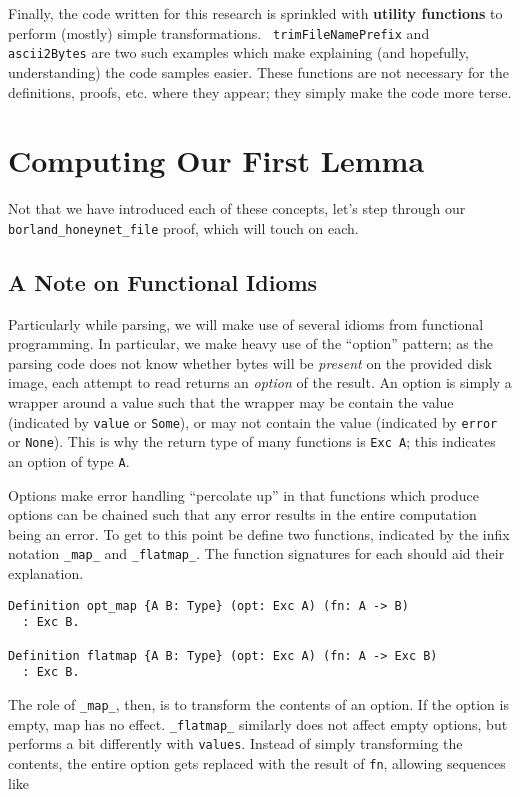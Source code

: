 \documentclass[nocopyrightspace]{sigplanconf}
\begin{document}
Finally, the code written for this research is sprinkled with {\bf utility
functions} to perform (mostly) simple transformations. {\tt
trimFileNamePrefix} and {\tt ascii2Bytes} are two such examples which make
explaining (and hopefully, understanding) the code samples easier. These
functions are not necessary for the definitions, proofs, etc. where they
appear; they simply make the code more terse.

\section{Computing Our First Lemma}

Not that we have introduced each of these concepts, let's step through our
{\tt borland\_honeynet\_file} proof, which will touch on each.

\subsection{A Note on Functional Idioms}

Particularly while parsing, we will make use of several idioms from functional
programming. In particular, we make heavy use of the ``option'' pattern; as
the parsing code does not know whether bytes will be {\em present} on the
provided disk image, each attempt to read returns an {\em option} of the
result. An option is simply a wrapper around a value such that the wrapper may
be contain the value (indicated by {\tt value} or {\tt Some}), or may not
contain the value (indicated by {\tt error} or {\tt None}). This is why the
return type of many functions is {\tt Exc A}; this indicates an option of type
{\tt A}.

Options make error handling ``percolate up'' in that functions which produce
options can be chained such that any error results in the entire computation
being an error. To get to this point be define two functions, indicated by the
infix notation {\tt \_map\_} and {\tt \_flatmap\_}. The function signatures
for each should aid their explanation.

\begin{lstlisting}
Definition opt_map {A B: Type} (opt: Exc A) (fn: A -> B)
  : Exc B.

Definition flatmap {A B: Type} (opt: Exc A) (fn: A -> Exc B)
  : Exc B.
\end{lstlisting}

The role of {\tt \_map\_}, then, is to transform the contents of an option. If
the option is empty, map has no effect. {\tt \_flatmap\_} similarly does not
affect empty options, but performs a bit differently with {\tt values}.
Instead of simply transforming the contents, the entire option gets replaced
with the result of {\tt fn}, allowing sequences like
\end{document}
